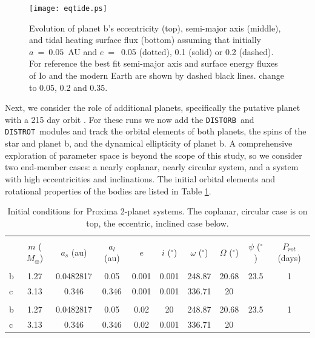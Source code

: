 \documentclass[preprint,12pt]{aastex}
\newcommand{\xxx}[1]{{\color{red} #1}} %
\def\distorb{\texttt{\footnotesize{DISTORB}}\xspace}
\def\distrot{\texttt{\footnotesize{DISTROT}}\xspace}
\begin{document}
\begin{figure} 
\begin{center}
\texttt{[image: eqtide.ps]}
\end{center}
\caption{Evolution of planet b's eccentricity (top), semi-major axis
  (middle), and tidal heating surface flux (bottom) assuming that
  initially $a~=~0.05$~AU and $e~=$~0.05 (dotted), 0.1 (solid) or 0.2
  (dashed). For reference the best fit semi-major axis and surface
  energy fluxes of Io and the modern Earth are shown by dashed black
  lines. \xxx{change to 0.05, 0.2 and 0.35.}}
\label{fig:eqtide}
\end{figure}

Next, we consider the role of additional planets, specifically the
putative planet with a 215 day orbit \citep{AngladaEscude16}. For
these runs we now add the \distorb~and \distrot~modules and track the
orbital elements of both planets, the spins of the star and planet b,
and the dynamical ellipticity of planet b. A comprehensive exploration
of parameter space is beyond the scope of this study, so we consider
two end-member cases: a nearly coplanar, nearly circular system, and a
system with high eccentricities and inclinations. The initial orbital
elements and rotational properties of the bodies are listed in Table \ref{tab:orbitic}.

\begin{table}[h]
\centering
\begin{tabular}{lccccccccc}
\hline\hline \\[-1.5ex]
& $m$ ($M_{\oplus}$)  & $a_s$ (au) & $a_l$ (au) & $e$ & $i$ ($^{\circ}$) & $\omega$ ($^{\circ}$) & $\Omega$ ($^{\circ}$) & $\psi$ ($^{\circ}$) & $P_{rot}$ (days)\\[0.5ex]
\hline \\ [-1.5ex]
b & 1.27 & 0.0482817 & 0.05 & 0.001 & 0.001 & 248.87 & 20.68 & 23.5 & 1  \\
c & 3.13 & 0.346 & 0.346 & 0.001 & 0.001 & 336.71 & 20 & &  \\
\hline \\
b & 1.27 & 0.0482817 & 0.05 & 0.02 & 20 & 248.87 & 20.68 & 23.5 & 1  \\
c & 3.13 & 0.346 & 0.346 & 0.02 & 0.001 & 336.71 & 20 & &  \\
\end{tabular}
\caption{Initial conditions for Proxima 2-planet systems. The coplanar, circular case is on top, the eccentric, inclined case below.}
\label{tab:orbitic}
\end{table}
\end{document}
